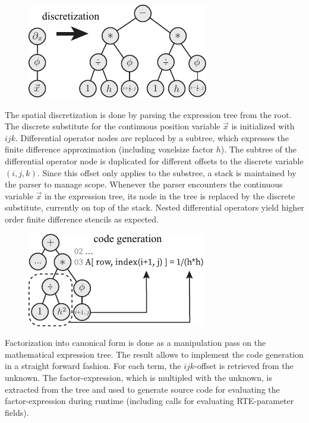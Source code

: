 \begin{figure}
\hspace{-.2in}
\includegraphics[width=0.6\columnwidth]{figures/fig_discretization.pdf}
\end{figure}The spatial discretization is done by parsing the expression tree from the root. The discrete substitute for the continuous position variable $\vec{x}$ is initialized with $ijk$. Differential operator nodes are replaced by a subtree, which expresses the finite difference approximation (including voxelsize factor $h$). The subtree of the differential operator node is duplicated for different offsets to the discrete variable $(i, j, k)$. Since this offset only applies to the substree, a stack is maintained by the parser to manage scope. Whenever the parser encounters the continuous variable $\vec{x}$ in the expression tree, its node in the tree is replaced by the discrete substitute, currently on top of the stack. Nested differential operators yield higher order finite difference stencils as expected.

\begin{figure}
\hspace{-.2in}
\includegraphics[width=0.6\columnwidth]{figures/fig_codegen.pdf}
\end{figure}
Factorization into canonical form is done as a manipulation pass on the mathematical expression tree. The result allows to implement the code generation in a straight forward fashion. For each term, the $ijk$-offset is retrieved from the unknown. The factor-expression, which is multipled with the unknown, is extracted from the tree and used to generate source code for evaluating the factor-expression during runtime (including calls for evaluating RTE-parameter fields).

